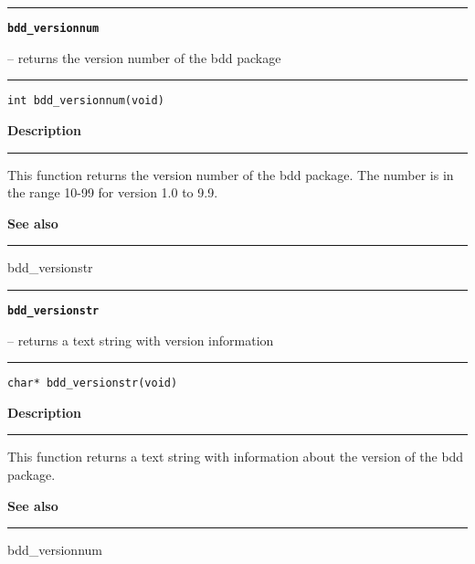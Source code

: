 \begin{minipage}{\textwidth}

\noindent\begin{minipage}{\textwidth}
\rule{\textwidth}{0.5mm}
{\tt\bf bdd\_versionnum }
\--- returns the version number of the bdd package  \hspace{\fill}
\\\rule[1.5ex]{\textwidth}{0.5mm}
\end{minipage}

\noindent\begin{verbatim}
int bdd_versionnum(void) 
\end{verbatim}

\vspace{\parsep}\noindent
{\bf Description}\\\rule[1.5ex]{\textwidth}{0.2mm}\vspace{-1.5ex}\setlength{\parindent}{1em}
This function returns the version number of the bdd package. The
           number is in the range 10-99 for version 1.0 to 9.9. 

\vspace{\parsep}\vspace{\baselineskip}\noindent
{\bf See also}\\\rule[1.5ex]{\textwidth}{0.2mm}\vspace{-1.5ex}
bdd\_versionstr 
\end{minipage}
\vspace{8ex}
\begin{minipage}{\textwidth}

\noindent\begin{minipage}{\textwidth}
\rule{\textwidth}{0.5mm}
{\tt\bf bdd\_versionstr }
\--- returns a text string with version information  \hspace{\fill}
\\\rule[1.5ex]{\textwidth}{0.5mm}
\end{minipage}

\noindent\begin{verbatim}
char* bdd_versionstr(void) 
\end{verbatim}

\vspace{\parsep}\noindent
{\bf Description}\\\rule[1.5ex]{\textwidth}{0.2mm}\vspace{-1.5ex}\setlength{\parindent}{1em}
This function returns a text string with information about the
           version of the bdd package. 

\vspace{\parsep}\vspace{\baselineskip}\noindent
{\bf See also}\\\rule[1.5ex]{\textwidth}{0.2mm}\vspace{-1.5ex}
bdd\_versionnum 
\end{minipage}
